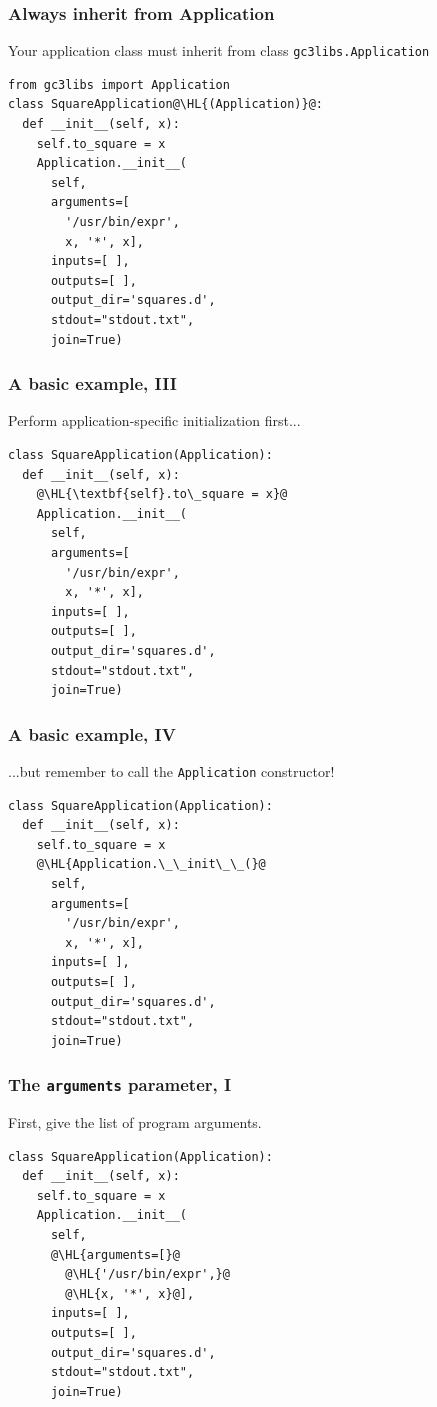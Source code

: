 \documentclass[english,serif,mathserif,xcolor=pdftex,dvipsnames,table]{beamer}
\begin{document}
\begin{frame}[fragile]
\frametitle{Always inherit from Application}

  Your application class must inherit from class \texttt{gc3libs.Application}
  \+
\begin{lstlisting}
from gc3libs import Application
class SquareApplication@\HL{(Application)}@:
  def __init__(self, x):
    self.to_square = x
    Application.__init__(
      self,
      arguments=[
        '/usr/bin/expr',
        x, '*', x],
      inputs=[ ],
      outputs=[ ],
      output_dir='squares.d',
      stdout="stdout.txt",
      join=True)
\end{lstlisting}
\end{frame}


\begin{frame}[fragile]
\frametitle{A basic example, III}

  Perform application-specific initialization first...
  \+
\begin{lstlisting}
class SquareApplication(Application):
  def __init__(self, x):
    @\HL{\textbf{self}.to\_square = x}@
    Application.__init__(
      self,
      arguments=[
        '/usr/bin/expr',
        x, '*', x],
      inputs=[ ],
      outputs=[ ],
      output_dir='squares.d',
      stdout="stdout.txt",
      join=True)
\end{lstlisting}
\end{frame}

\begin{frame}[fragile]
\frametitle{A basic example, IV}

  ...but remember to call the \lstinline|Application| constructor!
  \+
\begin{lstlisting}
class SquareApplication(Application):
  def __init__(self, x):
    self.to_square = x
    @\HL{Application.\_\_init\_\_(}@
      self,
      arguments=[
        '/usr/bin/expr',
        x, '*', x],
      inputs=[ ],
      outputs=[ ],
      output_dir='squares.d',
      stdout="stdout.txt",
      join=True)
\end{lstlisting}
\end{frame}

\begin{frame}[fragile]
\frametitle{The \texttt{arguments} parameter, I}

  First, give the list of program arguments.

  \+
\begin{lstlisting}
class SquareApplication(Application):
  def __init__(self, x):
    self.to_square = x
    Application.__init__(
      self,
      @\HL{arguments=[}@
        @\HL{'/usr/bin/expr',}@
        @\HL{x, '*', x}@],
      inputs=[ ],
      outputs=[ ],
      output_dir='squares.d',
      stdout="stdout.txt",
      join=True)
\end{lstlisting}
\end{frame}
\end{document}
